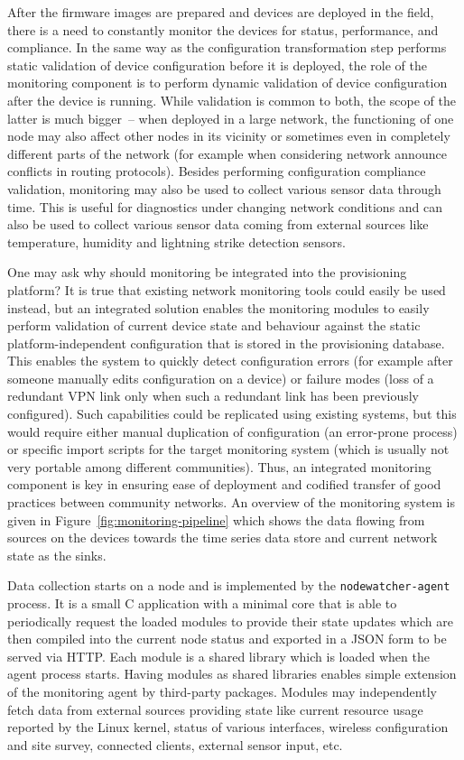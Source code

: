 \documentclass[5p,sort&compress]{elsarticle}
\begin{document}
After the firmware images are prepared and devices are deployed in the field, there is a need to constantly monitor the devices for status, performance, and compliance.
In the same way as the configuration transformation step performs static validation of device configuration before it is deployed, the role of the monitoring component is to perform dynamic validation of device configuration after the device is running.
While validation is common to both, the scope of the latter is much bigger~-- when deployed in a large network, the functioning of one node may also affect other nodes in its vicinity or sometimes even in completely different parts of the network (for example when considering network announce conflicts in routing protocols).
Besides performing configuration compliance validation, monitoring may also be used to collect various sensor data through time.
This is useful for diagnostics under changing network conditions and can also be used to collect various sensor data coming from external sources like temperature, humidity and lightning strike detection sensors.

One may ask why should monitoring be integrated into the provisioning platform?
It is true that existing network monitoring tools could easily be used instead, but an integrated solution enables the monitoring modules to easily perform validation of current device state and behaviour against the static platform-independent configuration that is stored in the provisioning database.
This enables the system to quickly detect configuration errors (for example after someone manually edits configuration on a device) or failure modes (loss of a redundant VPN link only when such a redundant link has been previously configured).
Such capabilities could be replicated using existing systems, but this would require either manual duplication of configuration (an error-prone process) or specific import scripts for the target monitoring system (which is usually not very portable among different communities).
Thus, an integrated monitoring component is key in ensuring ease of deployment and codified transfer of good practices between community networks.
An overview of the monitoring system is given in Figure~\ref{fig:monitoring-pipeline} which shows the data flowing from sources on the devices towards the time series data store and current network state as the sinks.

Data collection starts on a node and is implemented by the \texttt{nodewatcher-agent} process.
It is a small C application with a minimal core that is able to periodically request the loaded modules to provide their state updates which are then compiled into the current node status and exported in a JSON form to be served via HTTP.
Each module is a shared library which is loaded when the agent process starts.
Having modules as shared libraries enables simple extension of the monitoring agent by third-party packages.
Modules may independently fetch data from external sources providing state like current resource usage reported by the Linux kernel, status of various interfaces, wireless configuration and site survey, connected clients, external sensor input, etc.
\end{document}
